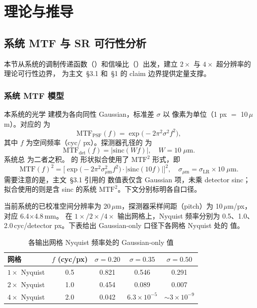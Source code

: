 \section{理论与推导}

\subsection{系统 MTF 与 SR 可行性分析}

本节从系统的调制传递函数（）和信噪比（）出发，建立 \(2\times\) 与 \(4\times\) 超分辨率的理论可行性边界，
为主文~\S3.1 和~\S1 的 claim 边界提供定量支撑。

\subsubsection{系统 MTF 模型}

本系统的光学  建模为各向同性 Gaussian，标准差 \(\sigma\) 以  像素为单位（1  px \(=\) 10\,\(\mu\)m）。对应的  为
\[
  \mathrm{MTF}_{\mathrm{PSF}}(f) = \exp\!\bigl(-2\pi^2 \sigma^2 f^2\bigr),
\]
其中 \(f\) 为空间频率（cyc/ px）。探测器孔径的  为
\[
  \mathrm{MTF}_{\mathrm{det}}(f) = \bigl|\mathrm{sinc}(W f)\bigr|, \quad W = 10\;\mu\mathrm{m}.
\]
系统总  为二者之积。 的  形状拟合使用了 \(\mathrm{MTF}^2\) 形式，即
\[
  \mathrm{MTF}(f)^2 = \bigl[\exp\!\bigl(-2\pi^2\sigma_{\mu\mathrm{m}}^2 f^2\bigr) \cdot \bigl|\mathrm{sinc}(10f)\bigr|\bigr]^2, \quad \sigma_{\mu\mathrm{m}} = \sigma_{\mathrm{LR}} \times 10\;\mu\mathrm{m}.
\]
需要注意的是，主文~\S3.1 引用的  数值表仅含 Gaussian  项，未乘 detector sinc； 拟合使用的则是含 sinc 的系统 \(\mathrm{MTF}^2\)。下文分别标明各自口径。

当前系统的已校准空间分辨率为 20\,\(\mu\)m，探测器采样间距（pitch）为 10\,\(\mu\)m/px，对应  6.4\(\times\)4.8\,mm。
在 \(1\times/2\times/4\times\) 输出网格上，Nyquist 频率分别为 0.5、1.0、2.0\,cyc/detector px。下表给出 Gaussian-only 口径下各网格 Nyquist 处的  值。

\begin{table}[ht]
  \centering
  \caption{各输出网格 Nyquist 频率处的 Gaussian-only  值}
  \label{tab:mtf-nyquist}
  \small
  \begin{tabular}{lcccc}
    \toprule
    网格 & \(f\) (cyc/px) & \(\sigma=0.20\) & \(\sigma=0.35\) & \(\sigma=0.50\) \\
    \midrule
    \(1\times\) Nyquist & 0.5 & 0.821 & 0.546 & 0.291 \\
    \(2\times\) Nyquist & 1.0 & 0.454 & 0.089 & 0.007 \\
    \(4\times\) Nyquist & 2.0 & 0.042 & \(6.3\times10^{-5}\) & \({\sim}3\times10^{-9}\) \\
    \bottomrule
  \end{tabular}
\end{table}

